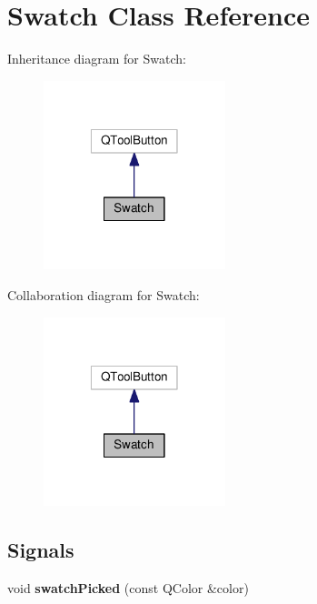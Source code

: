 \hypertarget{classSwatch}{\section{Swatch Class Reference}
\label{classSwatch}
}


Inheritance diagram for Swatch\-:\nopagebreak
\begin{figure}[H]
\begin{center}
\leavevmode
\includegraphics[width=150pt]{classSwatch__inherit__graph}
\end{center}
\end{figure}


Collaboration diagram for Swatch\-:\nopagebreak
\begin{figure}[H]
\begin{center}
\leavevmode
\includegraphics[width=150pt]{classSwatch__coll__graph}
\end{center}
\end{figure}
\subsection*{Signals}
\begin{DoxyCompactItemize}
\item 
\hypertarget{classSwatch_a4cc4620ddd05270f7c9a11addefcad57}{void {\bfseries swatch\-Picked} (const Q\-Color \&color)}\label{classSwatch_a4cc4620ddd05270f7c9a11addefcad57}

\end{DoxyCompactItemize}
